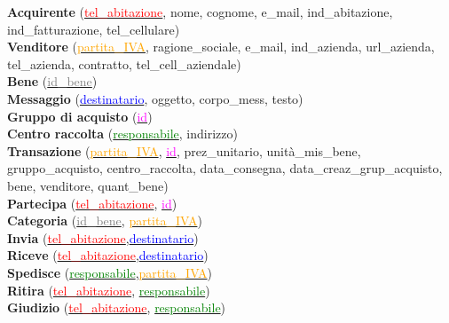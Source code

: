 \documentclass[a4paper, 10pt]{report}
\begin{document}
\raggedright
\textbf{Acquirente} (\underline{\textcolor{red}{tel\_abitazione}}, nome, cognome, e\_mail, ind\_abitazione, ind\_fatturazione, tel\_cellulare)\\
\textbf{Venditore} (\underline{\textcolor{orange}{partita\_IVA}}, ragione\_sociale, e\_mail, ind\_azienda, url\_azienda, tel\_azienda, contratto, tel\_cell\_aziendale)\\
\textbf{Bene} (\underline{\textcolor{gray}{id\_bene}})\\
\textbf{Messaggio} (\underline{\textcolor{blue}{destinatario}}, oggetto, corpo\_mess, testo)\\
\textbf{Gruppo di acquisto} (\underline{\textcolor{magenta}{id}})\\
\textbf{Centro raccolta} (\underline{\textcolor{green}{responsabile}}, indirizzo)\\
\textbf{Transazione} (\underline{\textcolor{orange}{partita\_IVA}}, \underline{\textcolor{magenta}{id}}, prez\_unitario, unit\`a\_mis\_bene, gruppo\_acquisto, centro\_raccolta, data\_consegna, data\_creaz\_grup\_acquisto, bene, venditore, quant\_bene)\\
\textbf{Partecipa} (\underline{\textcolor{red}{tel\_abitazione}}, \underline{\textcolor{magenta}{id}})\\
\textbf{Categoria} (\underline{\textcolor{gray}{id\_bene}}, \underline{\textcolor{orange}{partita\_IVA}})\\
\textbf{Invia} (\underline{\textcolor{red}{tel\_abitazione}},\underline{\textcolor{blue}{destinatario}})\\
\textbf{Riceve} (\underline{\textcolor{red}{tel\_abitazione}},\underline{\textcolor{blue}{destinatario}})\\
\textbf{Spedisce} (\underline{\textcolor{green}{responsabile}},\underline{\textcolor{orange}{partita\_IVA}})\\
\textbf{Ritira} (\underline{\textcolor{red}{tel\_abitazione}}, \underline{\textcolor{green}{responsabile}})\\
\textbf{Giudizio} (\underline{\textcolor{red}{tel\_abitazione}}, \underline{\textcolor{green}{responsabile}})\\
\end{document}
